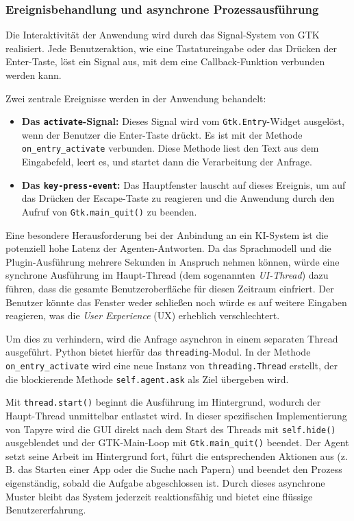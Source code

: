 \subsubsection{Ereignisbehandlung und asynchrone Prozessausführung}
Die Interaktivität der Anwendung wird durch das Signal-System von GTK realisiert. Jede Benutzeraktion, wie eine Tastatureingabe oder das Drücken der Enter-Taste, löst ein Signal aus, mit dem eine Callback-Funktion verbunden werden kann.

Zwei zentrale Ereignisse werden in der Anwendung behandelt:
\begin{itemize}
	\item \textbf{Das \texttt{activate}-Signal:} Dieses Signal wird vom \texttt{Gtk.Entry}-Widget ausgelöst, wenn der Benutzer die Enter-Taste drückt. Es ist mit der Methode \texttt{on\_entry\_activate} verbunden. Diese Methode liest den Text aus dem Eingabefeld, leert es, und startet dann die Verarbeitung der Anfrage.
	\item \textbf{Das \texttt{key-press-event}:} Das Hauptfenster lauscht auf dieses Ereignis, um auf das Drücken der Escape-Taste zu reagieren und die Anwendung durch den Aufruf von \texttt{Gtk.main\_quit()} zu beenden.
\end{itemize}

Eine besondere Herausforderung bei der Anbindung an ein KI-System ist die potenziell hohe Latenz der Agenten-Antworten. Da das Sprachmodell und die Plugin-Ausführung mehrere Sekunden in Anspruch nehmen können, würde eine synchrone Ausführung im Haupt-Thread (dem sogenannten \textit{UI-Thread}) dazu führen, dass die gesamte Benutzeroberfläche für diesen Zeitraum einfriert. Der Benutzer könnte das Fenster weder schließen noch würde es auf weitere Eingaben reagieren, was die \textit{User Experience} (UX) erheblich verschlechtert.

Um dies zu verhindern, wird die Anfrage asynchron in einem separaten Thread ausgeführt. Python bietet hierfür das \texttt{threading}-Modul. In der Methode \texttt{on\_entry\_activate} wird eine neue Instanz von \texttt{threading.Thread} erstellt, der die blockierende Methode \texttt{self.agent.ask} als Ziel übergeben wird.



Mit \texttt{thread.start()} beginnt die Ausführung im Hintergrund, wodurch der Haupt-Thread unmittelbar entlastet wird. In dieser spezifischen Implementierung von Tapyre wird die GUI direkt nach dem Start des Threads mit \texttt{self.hide()} ausgeblendet und der GTK-Main-Loop mit \texttt{Gtk.main\_quit()} beendet. Der Agent setzt seine Arbeit im Hintergrund fort, führt die entsprechenden Aktionen aus (z.\,B. das Starten einer App oder die Suche nach Papern) und beendet den Prozess eigenständig, sobald die Aufgabe abgeschlossen ist. Durch dieses asynchrone Muster bleibt das System jederzeit reaktionsfähig und bietet eine flüssige Benutzererfahrung.

